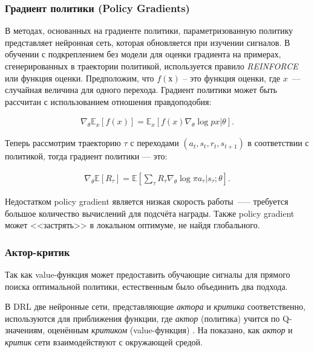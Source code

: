 \subsubsection{Градиент политики (Policy Gradients)}

В методах, основанных на градиенте политики, параметризованную политику представляет нейронная сеть, которая обновляется при изучении сигналов. В обучении с подкреплением без модели для оценки градиента на примерах, сгенерированных в траектории политикой, используется правило {\itshape REINFORCE} или функция оценки. Предположим, что $f(х)$ – это функция оценки, где $x$~--- случайная величина для одного перехода. Градиент политики может быть рассчитан с использованием отношения правдоподобия:

\begin{equation}
    \label{eq:ch1-likelihood-ratios}
    \begin{multlined}
        \nabla_\theta \mathbb{E}_x[f(x)] = \mathbb{E}_x[f(x) \nabla_\theta \log p x|\theta].
    \end{multlined}
\end{equation}

Теперь рассмотрим траекторию $\tau$ с переходами $(a_t, s_t, r_t, s_{t+1})$ в соответствии с политикой, тогда градиент политики --- это:

\begin{equation}
    \label{eq:ch1-likelihood-ratios}
    \begin{multlined}
        \nabla_\theta \mathbb{E}[R_\tau] = \mathbb{E}[\sum_\tau R_\tau \nabla_\theta \log \pi {a_\tau|s_\tau;\theta}].
    \end{multlined}
\end{equation}

Недостатком policy gradient является низкая скорость работы~—-- требуется большое количество вычислений для подсчёта награды. Также policy gradient может <<застрять>> в локальном оптимуме, не найдя глобального.

\subsubsection{Актор-критик}

Так как value-функция может предоставить обучающие сигналы для прямого поиска оптимальной политики, естественным было объединить два подхода.

В DRL две нейронные сети, представляющие \textit{актора} и \textit{критика} соответственно, используются для приближения функции, где \textit{актор} (политика) учится по Q-значениям, оценённым \textit{критиком} (value-функция) \cite{Arulkumaran_2017}. На  показано, как \textit{актор} и \textit{критик} сети взаимодействуют с окружающей средой.

